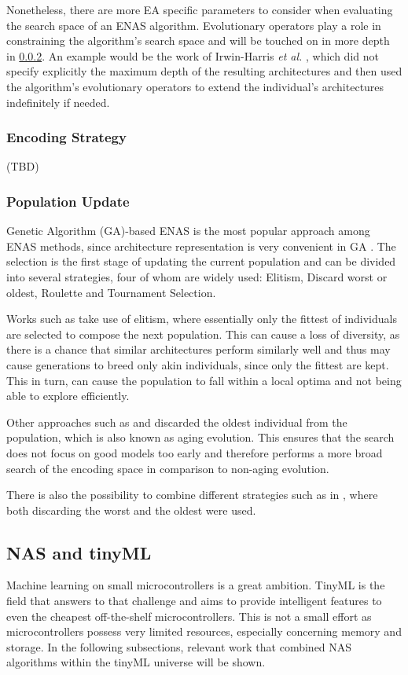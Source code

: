 \documentclass[10pt,        %
               a4paper,     %
               journal,     %
               ]{IEEEtran}
\begin{document}
Nonetheless, there are more EA specific
parameters to consider when evaluating the search space of an ENAS algorithm. Evolutionary operators play a role in
constraining the algorithm's search space and will be touched on in more depth in \ref{pop}. An example would be the
work of Irwin-Harris \textit{et al.} \cite{irwin2019graph}, which did not specify explicitly the maximum depth of the
resulting architectures and then used the algorithm's evolutionary operators to extend the individual's architectures
indefinitely if needed.

\subsubsection{Encoding Strategy} (TBD)

\subsubsection{Population Update}
\label{pop}
Genetic Algorithm (GA)-based ENAS is the most popular approach among ENAS methods, since architecture representation is
very convenient in GA \cite{liu2021survey}. The selection is the first stage of updating the current population and can
be divided into several strategies, four of whom are widely used: Elitism, Discard worst or oldest, Roulette and Tournament
Selection.

Works such as \cite{elsken2017simple} take use of elitism, where essentially only the fittest of individuals are selected to
compose the next population. This can cause a loss of diversity, as there is a chance that similar architectures perform
similarly well and thus may cause generations to breed only akin individuals, since only the fittest are kept. This in turn,
can cause the population to fall within a local optima and not being able to explore efficiently.

Other approaches such as \cite{pmlr-v70-real17a} and \cite{zhang2019identify} discarded the oldest individual from the population,
which is also known as aging evolution. This ensures that the search does not focus on good models too early and therefore
performs a more broad search of the encoding space in comparison to non-aging evolution.

There is also the possibility to combine different strategies such as in \cite{zhu2019eena}, where both discarding the worst and the oldest
were used.

\subsection{NAS and tinyML}
\label{nasml}
Machine learning on small microcontrollers is a great ambition. TinyML is the field that answers to that challenge
and aims to provide intelligent features to even the cheapest off-the-shelf microcontrollers. This is not a
small effort as microcontrollers possess very limited resources, especially concerning memory and storage. In the following
subsections, relevant work that combined NAS algorithms within the tinyML universe will be shown.
\end{document}
